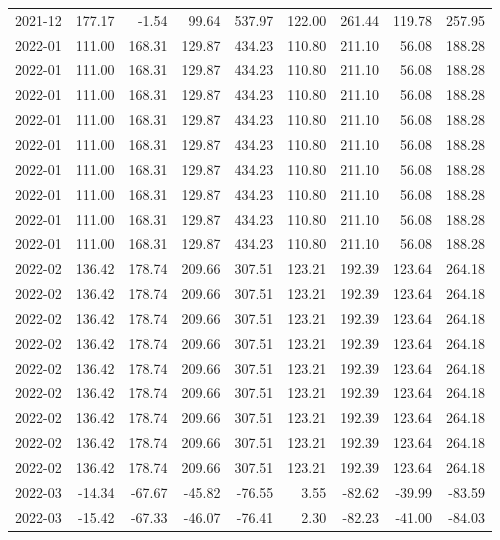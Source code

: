 \begin{table}[ht]
\begin{tabular}{lrrrrrrrr}
  2021-12 & 177.17 & -1.54 & 99.64 & 537.97 & 122.00 & 261.44 & 119.78 & 257.95 \\ 
  2022-01 & 111.00 & 168.31 & 129.87 & 434.23 & 110.80 & 211.10 & 56.08 & 188.28 \\ 
  2022-01 & 111.00 & 168.31 & 129.87 & 434.23 & 110.80 & 211.10 & 56.08 & 188.28 \\ 
  2022-01 & 111.00 & 168.31 & 129.87 & 434.23 & 110.80 & 211.10 & 56.08 & 188.28 \\ 
  2022-01 & 111.00 & 168.31 & 129.87 & 434.23 & 110.80 & 211.10 & 56.08 & 188.28 \\ 
  2022-01 & 111.00 & 168.31 & 129.87 & 434.23 & 110.80 & 211.10 & 56.08 & 188.28 \\ 
  2022-01 & 111.00 & 168.31 & 129.87 & 434.23 & 110.80 & 211.10 & 56.08 & 188.28 \\ 
  2022-01 & 111.00 & 168.31 & 129.87 & 434.23 & 110.80 & 211.10 & 56.08 & 188.28 \\ 
  2022-01 & 111.00 & 168.31 & 129.87 & 434.23 & 110.80 & 211.10 & 56.08 & 188.28 \\ 
  2022-01 & 111.00 & 168.31 & 129.87 & 434.23 & 110.80 & 211.10 & 56.08 & 188.28 \\ 
  2022-02 & 136.42 & 178.74 & 209.66 & 307.51 & 123.21 & 192.39 & 123.64 & 264.18 \\ 
  2022-02 & 136.42 & 178.74 & 209.66 & 307.51 & 123.21 & 192.39 & 123.64 & 264.18 \\ 
  2022-02 & 136.42 & 178.74 & 209.66 & 307.51 & 123.21 & 192.39 & 123.64 & 264.18 \\ 
  2022-02 & 136.42 & 178.74 & 209.66 & 307.51 & 123.21 & 192.39 & 123.64 & 264.18 \\ 
  2022-02 & 136.42 & 178.74 & 209.66 & 307.51 & 123.21 & 192.39 & 123.64 & 264.18 \\ 
  2022-02 & 136.42 & 178.74 & 209.66 & 307.51 & 123.21 & 192.39 & 123.64 & 264.18 \\ 
  2022-02 & 136.42 & 178.74 & 209.66 & 307.51 & 123.21 & 192.39 & 123.64 & 264.18 \\ 
  2022-02 & 136.42 & 178.74 & 209.66 & 307.51 & 123.21 & 192.39 & 123.64 & 264.18 \\ 
  2022-02 & 136.42 & 178.74 & 209.66 & 307.51 & 123.21 & 192.39 & 123.64 & 264.18 \\ 
  2022-03 & -14.34 & -67.67 & -45.82 & -76.55 & 3.55 & -82.62 & -39.99 & -83.59 \\ 
  2022-03 & -15.42 & -67.33 & -46.07 & -76.41 & 2.30 & -82.23 & -41.00 & -84.03 \\ 

\end{tabular}
\end{table}
